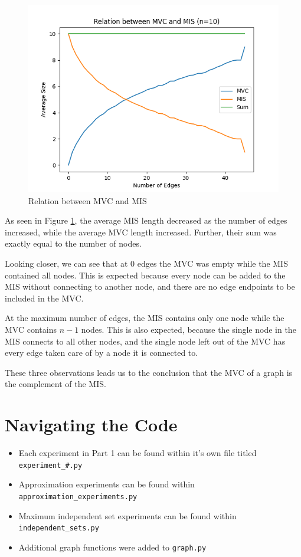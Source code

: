 \documentclass[titlepage]{article}
\begin{document}
\begin{figure}[H]
    \centering
    \includegraphics[width=0.8\linewidth]{mvc_mis.png}
    \caption{Relation between MVC and MIS}
    \label{fig:mvc_mis}
\end{figure}

As seen in Figure \ref{fig:mvc_mis}, the average MIS length decreased as the number of edges increased, while the average MVC length increased. Further, their sum was exactly equal to the number of nodes.

Looking closer, we can see that at 0 edges the MVC was empty while the MIS contained all nodes. This is expected because every node can be added to the MIS without connecting to another node, and there are no edge endpoints to be included in the MVC.

At the maximum number of edges, the MIS contains only one node while the MVC contains $n-1$ nodes. This is also expected, because the single node in the MIS connects to all other nodes, and the single node left out of the MVC has every edge taken care of by a node it is connected to.

These three observations leads us to the conclusion that the MVC of a graph is the complement of the MIS.

\appendix
\section{Navigating the Code}

\begin{itemize}
    \item Each experiment in Part 1 can be found within it's own file titled \verb|experiment_#.py|
    \item Approximation experiments can be found within \verb|approximation_experiments.py|
    \item Maximum independent set experiments can be found within \verb|independent_sets.py|
    \item Additional graph functions were added to \verb|graph.py|
\end{itemize}
\end{document}
